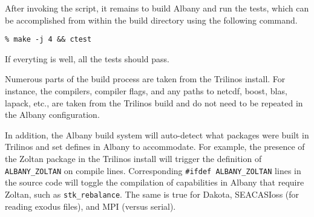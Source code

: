 \documentclass[pdf,12pt,report,strict]{SANDreport}
\theoremstyle{remark}
\begin{document}
After invoking the script, it remains to build Albany and run the
tests, which can be accomplished from within the build directory using
the following command.
\begin{verbatim}
% make -j 4 && ctest
\end{verbatim}
If everyting is well, all the tests should pass. 

Numerous parts of the build process are taken from the Trilinos install.
For instance, the compilers, compiler flags, and any paths to netcdf,
boost, blas, lapack, etc., are taken from the Trilinos build and do not
need to be repeated in the Albany configuration.

In addition, the Albany build system will auto-detect what packages 
were built in Trilinos and set defines in Albany to accommodate.
For example, the presence of the Zoltan package in the Trilinos install
will trigger the definition of \texttt{ALBANY\_ZOLTAN}  on compile lines. 
Corresponding \texttt{\#ifdef ALBANY\_ZOLTAN} lines in the source code
will toggle the compilation of capabilities in Albany that require
Zoltan, such as \texttt{stk\_rebalance}. The same is true for Dakota,
SEACASIoss (for reading exodus files), and MPI (versus serial).
\end{document}
